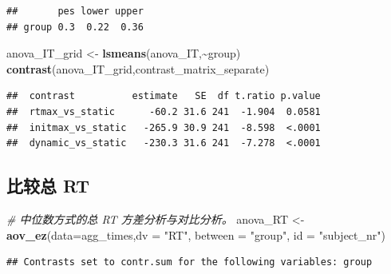\documentclass[
]{article}
\newenvironment{Shaded}{\begin{snugshade}}{\end{snugshade}}
\newcommand{\AttributeTok}[1]{\textcolor[rgb]{0.13,0.29,0.53}{#1}}
\newcommand{\CommentTok}[1]{\textcolor[rgb]{0.56,0.35,0.01}{\textit{#1}}}
\newcommand{\DecValTok}[1]{\textcolor[rgb]{0.00,0.00,0.81}{#1}}
\newcommand{\FunctionTok}[1]{\textcolor[rgb]{0.13,0.29,0.53}{\textbf{#1}}}
\newcommand{\NormalTok}[1]{#1}
\newcommand{\OtherTok}[1]{\textcolor[rgb]{0.56,0.35,0.01}{#1}}
\newcommand{\SpecialCharTok}[1]{\textcolor[rgb]{0.81,0.36,0.00}{\textbf{#1}}}
\newcommand{\StringTok}[1]{\textcolor[rgb]{0.31,0.60,0.02}{#1}}
\begin{document}
\begin{Shaded}
\end{Shaded}

\begin{verbatim}
##       pes lower upper
## group 0.3  0.22  0.36
\end{verbatim}

\begin{Shaded}
\begin{Highlighting}[]
\NormalTok{anova\_IT\_grid }\OtherTok{\textless{}{-}} \FunctionTok{lsmeans}\NormalTok{(anova\_IT,}\SpecialCharTok{\textasciitilde{}}\NormalTok{group)}
\FunctionTok{contrast}\NormalTok{(anova\_IT\_grid,contrast\_matrix\_separate)}
\end{Highlighting}
\end{Shaded}

\begin{verbatim}
##  contrast          estimate   SE  df t.ratio p.value
##  rtmax_vs_static      -60.2 31.6 241  -1.904  0.0581
##  initmax_vs_static   -265.9 30.9 241  -8.598  <.0001
##  dynamic_vs_static   -230.3 31.6 241  -7.278  <.0001
\end{verbatim}

\subsection{比较总 RT}\label{ux6bd4ux8f83ux603b-rt-1}

\begin{Shaded}
\begin{Highlighting}[]
\CommentTok{\# 中位数方式的总 RT 方差分析与对比分析。}
\NormalTok{anova\_RT }\OtherTok{\textless{}{-}} \FunctionTok{aov\_ez}\NormalTok{(}\AttributeTok{data=}\NormalTok{agg\_times,}\AttributeTok{dv =} \StringTok{"RT"}\NormalTok{, }\AttributeTok{between =} \StringTok{"group"}\NormalTok{, }\AttributeTok{id =} \StringTok{"subject\_nr"}\NormalTok{)}
\end{Highlighting}
\end{Shaded}

\begin{verbatim}
## Contrasts set to contr.sum for the following variables: group
\end{verbatim}
\end{document}
